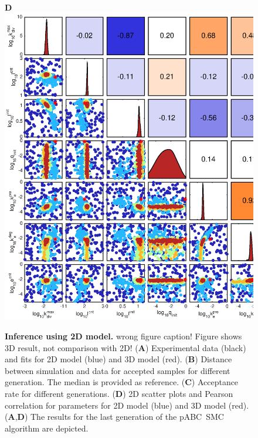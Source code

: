 \documentclass[10pt,letterpaper]{article}
\newcommand{\nj}[1]{{\color{blue}#1}}
\begin{document}
\begin{figure}[p]
\begin{adjustwidth}{-2in}{0in}
\begin{center}
\begin{minipage}[t]{0.45\textwidth}
\end{minipage}
\begin{minipage}[t]{0.85\textwidth}
	\textbf{D}\\ \includegraphics[width=\textwidth]{Data/Tumor2dGCKI67ECM-scatterPlotMatrix.eps}
\end{minipage}
\end{center}
\vspace*{0.5cm}
\caption{{\bf Inference using 2D model.} \nj{wrong figure caption! Figure shows 3D result, not comparison with 2D!}
(\textbf{A}) Experimental data (black) and fits for 2D model (blue) and 3D model (red).
(\textbf{B}) Distance between simulation and data for accepted samples for different generation. The median is provided as reference. 
(\textbf{C}) Acceptance rate for different generations.
(\textbf{D}) 2D scatter plots and Pearson correlation for parameters for 2D model (blue) and 3D model (red). 
(\textbf{A},\textbf{D}) The results for the last generation of the pABC~SMC algorithm are depicted.
}
\label{fig: fitting of 2D model to experimental data for case without nutrition limitation}
\end{adjustwidth}
\end{figure}
\end{document}

